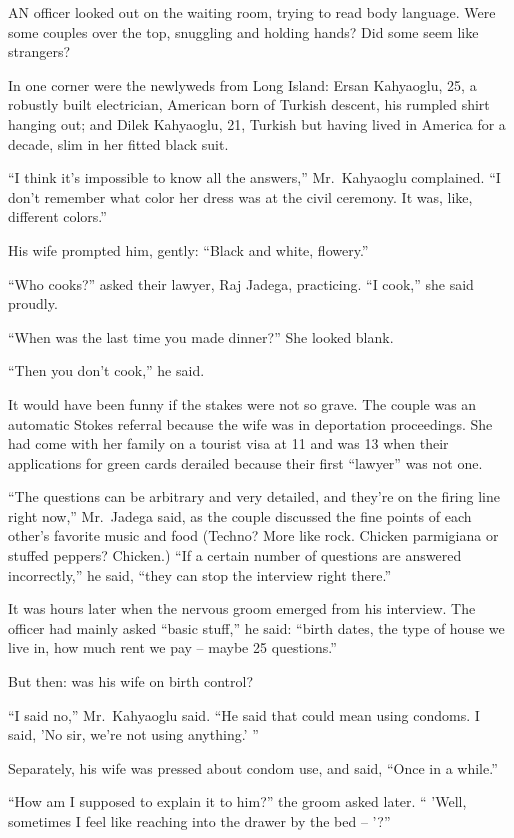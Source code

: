 ﻿\documentclass[12pt]{article}
\begin{document}
AN officer looked out on the waiting room, trying to read body language. Were some couples over the
top, snuggling and holding hands? Did some seem like strangers?

In one corner were the newlyweds from Long Island: Ersan Kahyaoglu, 25, a robustly built
electrician, American born of Turkish descent, his rumpled shirt hanging out; and Dilek Kahyaoglu,
21, Turkish but having lived in America for a decade, slim in her fitted black suit.

``I think it's impossible to know all the answers,'' Mr.~Kahyaoglu complained. ``I don't remember
what color her dress was at the civil ceremony. It was, like, different colors.''

His wife prompted him, gently: ``Black and white, flowery.''

``Who cooks?'' asked their lawyer, Raj Jadega, practicing. ``I cook,'' she said proudly.

``When was the last time you made dinner?'' She looked blank.

``Then you don't cook,'' he said.

It would have been funny if the stakes were not so grave. The couple was an automatic Stokes
referral because the wife was in deportation proceedings. She had come with her family on a tourist
visa at 11 and was 13 when their applications for green cards derailed because their first
``lawyer'' was not one.

``The questions can be arbitrary and very detailed, and they're on the firing line right now,''
Mr.~Jadega said, as the couple discussed the fine points of each other's favorite music and food
(Techno? More like rock. Chicken parmigiana or stuffed peppers? Chicken.) ``If a certain number of
questions are answered incorrectly,'' he said, ``they can stop the interview right there.''

It was hours later when the nervous groom emerged from his interview. The officer had mainly asked
``basic stuff,'' he said: ``birth dates, the type of house we live in, how much rent we pay -- maybe
25 questions.''

But then: was his wife on birth control?

``I said no,'' Mr.~Kahyaoglu said. ``He said that could mean using condoms. I said, 'No sir, we're
not using anything.' ''

Separately, his wife was pressed about condom use, and said, ``Once in a while.''

``How am I supposed to explain it to him?'' the groom asked later. `` 'Well, sometimes I feel like
reaching into the drawer by the bed -- '?''
\end{document}
